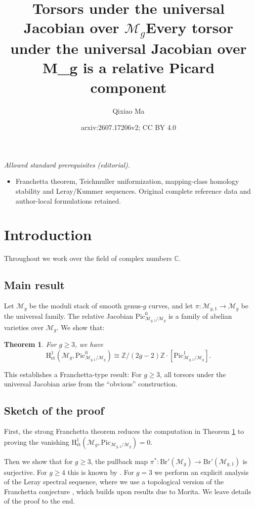 \documentclass[12pt]{amsart}
\title{Torsors under the universal Jacobian over $\mathcal{M}_g$}
\title{Every torsor under the universal Jacobian over M\_g is a relative Picard component}
\author{Qixiao Ma}
\date{arxiv:2607.17206v2; CC BY 4.0}
\newtheorem{theorem}{Theorem}
\begin{document}
\maketitle
\noindent\textit{Allowed standard prerequisites (editorial).}\begin{itemize}
\item Franchetta theorem, Teichmuller uniformization, mapping-class homology stability and Leray/Kummer sequences. Original complete reference data and author-local formulations retained.
\end{itemize}\medskip
\section{Introduction}
Throughout we work over the field of complex numbers $\mathbb{C}$.
\subsection{Main result}Let $\mathcal{M}_{g}$ be the moduli stack of smooth genus-$g$ curves, and let $\pi\colon \mathcal{M}_{g,1}\to \mathcal{M}_{g}$ be the universal family. 
The relative Jacobian $\mathrm{Pic}^0_{\mathcal{M}_{g,1}/\mathcal{M}_{g}}$ is a family of abelian varieties over $\mathcal{M}_g$. We show that:

\begin{theorem}\label{Main_Theorem}For $g\geq3$, we have $$\mathrm{H}^1_{\mathrm{\acute{e}t}}(\mathcal{M}_{g},\mathrm{Pic}^0_{\mathcal{M}_{g,1}/\mathcal{M}_{g}})\cong{\mathbb{Z}}/{(2g-2)\mathbb{Z}}\cdot[\mathrm{Pic}^1_{\mathcal{M}_{g,1}/\mathcal{M}_{g}}].$$
\end{theorem}

This establishes a Franchetta-type result: For $g\geq3$, all torsors under the universal Jacobian arise from the ``obvious'' construction. 


\subsection{Sketch of the proof}First, the strong Franchetta theorem \cite[Theorem 5.1]{zbMATH02078578} reduces the computation in Theorem \ref{Main_Theorem} to proving the vanishing $\mathrm{H}^1_{\textrm{\'et}}(\mathcal{M}_g,\mathrm{Pic}_{\mathcal{M}_{g,1}/\mathcal{M}_g})=0$. 

Then we show that for $g\geq3$, the pullback map $\pi^*\colon\mathrm{Br}'(\mathcal{M}_g)\to\mathrm{Br}'(\mathcal{M}_{g,1})$ is surjective. For $g\geq4$ this is known by \cite[Theorem 4.1]{zbMATH08105076}. For $g=3$ we perform an explicit analysis of the Leray spectral sequence, where we use a topological version of the Franchetta conjecture \cite[Theorem 24]{zbMATH01590471}, which builds upon results due to Morita. We leave details of the proof to the end.
\end{document}
